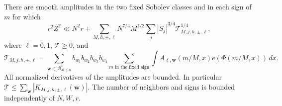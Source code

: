 \begin{proposition}\label{prop:dualityproof}
There are smooth amplitudes in the two fixed Sobolev classes and in
each sign of $m$ for which
\begin{equation}\label{eq:preciseduality}
 r^2Z^2\ll N^2r+
 \sum_{M,h,\pm,\ell}N^{7/4}M^{1/2}
 \sum_j |S_j|^{3/4}\mathcal T_{M,j,h,\pm,\ell}^{1/4},
\end{equation}
where $\ell=0,1$, $\mathcal T\ge0$, and
\[
 \mathcal T_{M,j,h,\pm,\ell}
 =\sum_{\mathbf w\in\mathcal B_{M,j,h}^4}
 b_{w_1}b_{w_2}\overline{b_{w_3}b_{w_4}}
 \sum_{m\text{ in the fixed sign}}\int A_{\ell,\mathbf w}(m/M,x)
 e(\Phi(m/M,x))\,dx.
\]
All normalized derivatives of the amplitudes are bounded. In particular
$\mathcal T\le\sum_{\mathbf w}|K_{M,j,h,\pm,\ell}(\mathbf w)|$.
The number of neighbors and signs is bounded independently of $N,W,r$.
\end{proposition}
